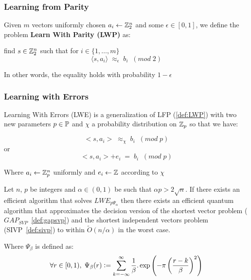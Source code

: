 \documentclass[a4paper,12pt]{article}
\begin{document}
\subsubsection{Learning from Parity}
\label{sec:orgce8af1a}
 \begin{definition}
  \label{def:LWP}
  Given $m$ vectors uniformly chosen  $a_i \gets \Z^n_2$ and some $\epsilon \in [0,1]$, we
  define the problem \textbf{Learn With Parity (LWP)} as:

  find $s \in \Z^n_2$ such that for $i \in \{1,\dots,m\}$
     $$ \langle{s, a_i}\rangle \; \approx_\epsilon \; b_i \;\; (mod\; 2) $$

     In other words, the equality holds with probability $1 - \epsilon$

\end{definition}

\subsubsection{Learning with Errors}
\label{sec:orgc27dbe6}
\begin{definition}
  \label{def:LWE}
  Learning With Errors (LWE) is a generalization of LFP (\ref{def:LWP}) with two new parameters $p \in \P$ and $\chi$ a probability distribution on $\Z_p$ so that we have:

     $$ <s, a_i> \; \approx_\chi \; b_i \;\; (mod\; p) $$
     or
     $$ <s, a_i> + e_i \; = \;  b_i \;\; (mod\; p) $$

     Where $a_i \gets \Z^n_p$ uniformly and $e_i \gets \Z$ according to $\chi$

\end{definition}

\begin{theorem}
  Let $n$, $p$ be integers and $\alpha \in (0, 1)$ be such that $\alpha p > 2\sqrt{n}$. If
  there exists an efficient algorithm that solves $LWE_{p \Psi_\alpha}$ then there
  exists an efficient quantum algorithm that approximates the decision version
  of the shortest vector problem ($GAP_{SVP}$~\ref{def:gapsvp}) and the
  shortest independent vectors problem (SIVP~\ref{def:sivp}) to within
  $\tilde{O}(n/\alpha)$ in the worst case.

  Where $\Psi_\beta$ is defined as:
  $$
  \forall r \in [0,1), \; \Psi_\beta(r) \defsym \sum_{k=-\infty}^\infty{\frac{1}{\beta} . \exp{\left( -\pi \left( \frac{r-k}{\beta} \right)^2 \right)}}
  $$
\end{theorem}
\end{document}
